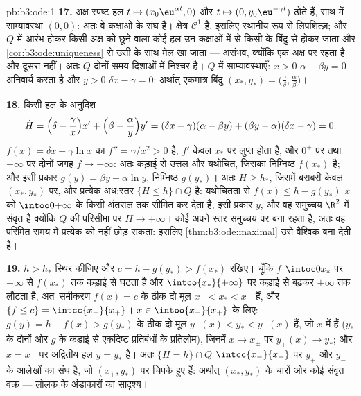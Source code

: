 \begin{solution}{pb:b3:ode:1}
\textbf{17.} अक्ष स्पष्ट हल $t
\mapsto (x_0\eu^{\alpha t}, 0)$ और $t \mapsto (0,
y_0\eu^{-\gamma t})$ ढोते हैं, साथ में
साम्यावस्था $(0, 0)$: अतः वे कक्षाओं के संघ हैं। क्षेत्र $\mathcal
C^1$ है, इसलिए
स्थानीय रूप से लिपशित्ज़; और $Q$ में आरंभ होकर किसी अक्ष को छूने
वाला कोई हल उन कक्षाओं में से किसी के बिंदु से होकर जाता और \cref{cor:b3:ode:uniqueness}
से उसी के साथ मेल खा जाता --- असंभव, क्योंकि एक अक्ष पर रहता है और
दूसरा नहीं। अतः $Q$ दोनों समय दिशाओं में निश्चर है। $Q$ में
साम्यावस्थाएँ: $x > 0$ $\alpha - \beta y = 0$ अनिवार्य करता है और $y > 0$ $\delta x - \gamma = 0$: अर्थात्
एकमात्र बिंदु $(x_*, y_*) = \bigl(\frac\gamma\delta,
\frac\alpha\beta\bigr)$।

\textbf{18.} किसी हल के अनुदिश
\[
\dot H = \Bigl(\delta - \frac\gamma x\Bigr)x' +
\Bigl(\beta - \frac\alpha y\Bigr)y'
= (\delta x - \gamma)(\alpha - \beta y) +
(\beta y - \alpha)(\delta x - \gamma) = 0 .
\]
$f(x) = \delta x - \gamma\ln x$ का $f'' = \gamma/x^2 > 0$ है, $f'$ केवल $x_*$ पर लुप्त होता है, और $0^+$ पर
तथा $+\infty$ पर दोनों जगह $f \to +\infty$: अतः कड़ाई से उत्तल और यथोचित, जिसका
निम्निष्ठ $f(x_*)$ है; और इसी प्रकार $g(y) = \beta y - \alpha\ln y$, निम्निष्ठ $g(y_*)$। अतः $H \geq h_*$,
जिसमें बराबरी केवल $(x_*,
y_*)$ पर, और प्रत्येक अध:स्तर $\{H \leq h\}\cap Q$  है:
यथोचितता से $f(x) \leq h - g(y_*)$ $x$ को $\intoo0{+\infty}$ के किसी  अंतराल तक सीमित कर देता
है, इसी प्रकार $y$, और वह समुच्चय $\R^2$ में संवृत है क्योंकि $Q$
की परिसीमा पर $H \to +\infty$। कोई  अपने  स्तर समुच्चय पर बना
रहता है, अतः वह परिमित समय में प्रत्येक  को नहीं छोड़ सकता: इसलिए
\cref{thm:b3:ode:maximal} उसे वैश्विक बना देती है।

\textbf{19.} $h > h_*$ स्थिर कीजिए और $c = h - g(y_*) >
f(x_*)$ रखिए। चूँकि $f$ $\intoc0{x_*}$ पर
$+\infty$ से $f(x_*)$ तक कड़ाई से घटता है और $\intco{x_*}{+\infty}$ पर कड़ाई से बढ़कर $+\infty$
तक लौटता है, अतः समीकरण $f(x) = c$ के ठीक दो मूल $x_- < x_* < x_+$ हैं, और $\{f \leq c\} =
\intcc{x_-}{x_+}$।
$x \in \intoo{x_-}{x_+}$ के लिए: $g(y) = h -
f(x) > g(y_*)$ के ठीक दो मूल $y_-(x) < y_* <
y_+(x)$ हैं, जो $x$ में  हैं
($y_*$ के दोनों ओर $g$ के कड़ाई से एकदिष्ट  प्रतिबंधों के
प्रतिलोम), जिनमें $x \to x_\pm$ पर $y_\pm(x) \to y_*$; और $x =
x_\pm$ पर अद्वितीय हल $y = y_*$ है।
अतः $\{H = h\}\cap
Q$ $\intcc{x_-}{x_+}$ पर $y_+$ और $y_-$ के आलेखों का संघ है, जो $(x_\pm, y_*)$ पर
चिपके हुए हैं: अर्थात् $(x_*, y_*)$ के चारों ओर कोई संवृत वक्र --- लोलक के
अंडाकारों का सादृश्य।


\end{solution}
